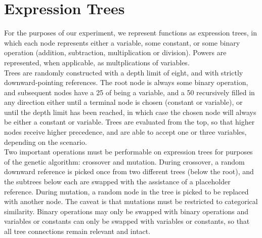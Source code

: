 
\section{Expression Trees}
\label{sec:background}

For the purposes of our experiment, we represent functions as expression
trees, in which each node represents either a variable, some constant, or
some binary operation (addition, subtraction, multiplication or division). Powers
are represented, when applicable, as multplications of variables. \\

Trees are randomly constructed with a depth limit of eight, and with strictly
downward-pointing references. The root node is always some binary operation,
and subsequent nodes have a 25%
of being a variable, and a 50%
recursively filled in any direction either until a terminal node is chosen (constant or variable),
or until the depth limit has been reached, in which case the chosen node will always
be either a constant or variable. Trees are evaluated from the top, so that higher nodes
receive higher precedence, and are able to accept one or three variables, depending
on the scenario. \\

Two important operations must be performable on expression trees for purposes of the
genetic algorithm: crossover and mutation. During crossover, a random downward reference
is picked once from two different trees (below the root), and the subtrees below each are
swapped with the assistance of a placeholder reference. During mutation, a random node in
the tree is picked to be replaced with another node. The caveat is that mutations must
be restricted to categorical similarity. Binary operations may only be swapped with binary
operations and variables or constants can only be swapped with variables or constants, so
that all tree connections remain relevant and intact. \\